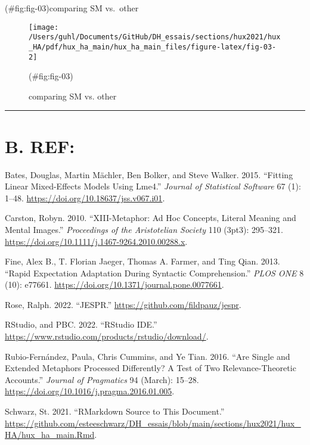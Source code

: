 \documentclass[
]{article}
\newlength{\cslhangindent}
\newlength{\cslentryspacingunit} %
\newenvironment{CSLReferences}[2] %
 {%
  \setlength{\parindent}{0pt}
  \ifodd #1
  \let\oldpar\par
  \def\par{\hangindent=\cslhangindent\oldpar}
  \fi
  \setlength{\parskip}{#2\cslentryspacingunit}
 }%
 {}
\begin{document}
(\#fig:fig-03)comparing SM vs.~other

\begin{figure}[H]
\texttt{[image: /Users/guhl/Documents/GitHub/DH\_essais/sections/hux2021/hux\_HA/pdf/hux\_ha\_main/hux\_ha\_main\_files/figure-latex/fig-03-2]} \caption{comparing SM vs. other}(\#fig:fig-03)
\end{figure}

\begin{center}\rule{0.5\linewidth}{0.5pt}\end{center}

\hypertarget{b.-ref}{%
\section*{B. REF:}\label{b.-ref}}

\hypertarget{refs}{}
\begin{CSLReferences}{1}{0}
\leavevmode{}%
Bates, Douglas, Martin Mächler, Ben Bolker, and Steve Walker. 2015. {``Fitting {Linear} {Mixed}-{Effects} {Models} {Using} Lme4.''} \emph{Journal of Statistical Software} 67 (1): 1--48. \url{https://doi.org/10.18637/jss.v067.i01}.

\leavevmode{}%
Carston, Robyn. 2010. {``{XIII}-{Metaphor}: {Ad} {Hoc} {Concepts}, {Literal} {Meaning} and {Mental} {Images}.''} \emph{Proceedings of the Aristotelian Society} 110 (3pt3): 295--321. \url{https://doi.org/10.1111/j.1467-9264.2010.00288.x}.

\leavevmode{}%
Fine, Alex B., T. Florian Jaeger, Thomas A. Farmer, and Ting Qian. 2013. {``Rapid {Expectation} {Adaptation} During {Syntactic} {Comprehension}.''} \emph{PLOS ONE} 8 (10): e77661. \url{https://doi.org/10.1371/journal.pone.0077661}.

\leavevmode{}%
Rose, Ralph. 2022. {``{JESPR}.''} \url{https://github.com/fildpauz/jespr}.

\leavevmode{}%
RStudio, and PBC. 2022. {``{RStudio} {IDE}.''} \url{https://www.rstudio.com/products/rstudio/download/}.

\leavevmode{}%
Rubio-Fernández, Paula, Chris Cummins, and Ye Tian. 2016. {``Are Single and Extended Metaphors Processed Differently? {A} Test of Two {Relevance}-{Theoretic} Accounts.''} \emph{Journal of Pragmatics} 94 (March): 15--28. \url{https://doi.org/10.1016/j.pragma.2016.01.005}.

\leavevmode{}%
Schwarz, St. 2021. {``{RMarkdown} Source to This Document.''} \url{https://github.com/esteeschwarz/DH_essais/blob/main/sections/hux2021/hux_HA/hux_ha_main.Rmd}.

\end{CSLReferences}
\end{document}
